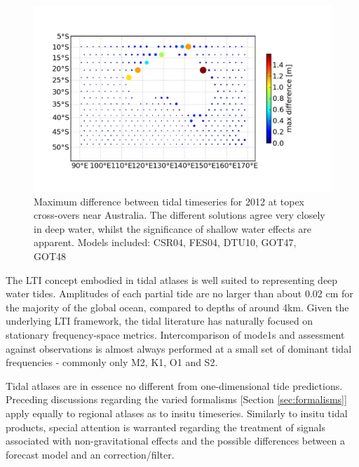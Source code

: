 \begin{figure}[h]
    \begin{center}
    \includegraphics[width=\figwidthBig]{figures/maps/map_tide_differences_tpx_xovers.png}
    \caption{Maximum difference between tidal timeseries for 2012 at topex cross-overs near Australia.  The different solutions agree very closely in deep water, whilst the significance of shallow water effects are apparent.  Models included: CSR04\citep{Eanes:1996tr}, FES04\citep{Lyard:2006ir}, DTU10\citep{IMPROVEMENTOFGLOBA:2010tu}, GOT47, GOT48\citep{Schrama:1994vr}\citep{Ray:1999vm} }
     \label{fig:tpx_cross}
\end{center}
\end{figure}

The LTI concept embodied in tidal atlases is well suited to representing deep water tides.   Amplitudes of each partial tide are no larger than about 0.02 cm for the majority of the global ocean, compared to depths of around 4km.
Given the underlying LTI framework, the tidal literature has naturally focused on stationary frequency-space metrics.  Intercomparison of mode1s and assessment against observations is almost always performed at a small set of dominant tidal frequencies - commonly only M2, K1, O1 and S2.


Tidal atlases are in essence no different from one-dimensional tide predictions.   Preceding discussions regarding the varied formalisms [Section \ref{sec:formalisms}] apply equally to regional atlases as to insitu timeseries.  Similarly to insitu tidal products, special attention is warranted regarding the treatment of signals associated with non-gravitational effects and the possible differences between a forecast model and an correction/filter.




